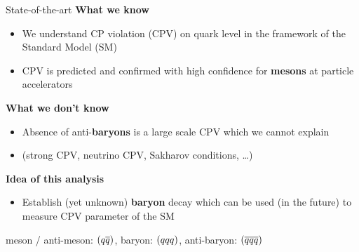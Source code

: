 \begin{frame}{State-of-the-art}
    \textbf{What we know}
    \begin{itemize}
        \item We understand CP violation (CPV) on quark level in the framework of the Standard Model (SM)
        \item CPV is predicted and confirmed with high confidence for \textbf{mesons}\ftnt{} at particle accelerators
    \end{itemize}
    \textbf{What we don't know}
    \begin{itemize}
        \item Absence of anti-\textbf{baryons}\ftnt{} is a large scale CPV which we cannot explain
        \item (strong CPV, neutrino CPV, Sakharov conditions, \ldots)
    \end{itemize}

    \textbf{Idea of this analysis}
    \begin{itemize}
        \item Establish (yet unknown) \textbf{baryon} decay which can be used (in the future) to measure CPV parameter of the SM
    \end{itemize}

    \vfill

    \footnotesize\ftnt meson / anti-meson: $({q}{\overline {{q}}})$, baryon: $({q}{q}{q})$, anti-baryon: $({\overline {{q}}}{\overline {{q}}}{\overline {{q}}})$
\end{frame}

